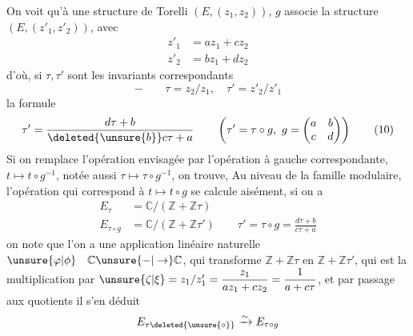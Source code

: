 On voit qu'à une structure de Torelli $(E,(z_1,z_2))$, $g$ associe la structure $(E,(z'_1,z'_2))$, avec
\[
\begin{aligned}
z'_1&=az_1+cz_2\\
z'_2&=bz_1+dz_2
\end{aligned}
\]
d'où, si $\tau,\tau'$ sont les invariants correspondants
\[
-\qquad \tau=z_2/z_1,\quad\tau'=z'_2/z'_1
\]
la formule
\[
\tau'=\frac{d\tau+b}{\deleted{\unsure{b}}c\tau+a}\qquad
\left(\tau'=\tau\circ g,\ g=\begin{pmatrix}a&b\\c&d\end{pmatrix}\right) \tag*{(10)}
\]
Si on remplace l'opération envisagée par l'opération à gauche correspondante,  $t\longmapsto t\circ g^{-1}$, notée aussi $\tau\longmapsto\tau\circ g^{-1}$, on trouve,
Au niveau de la famille modulaire, l'opération qui correspond à $t\longmapsto t\circ g$ se calcule aisément, si on a
\[
\begin{aligned}
E_\tau &=\mathbb C/(\mathbb Z+\mathbb Z\tau)\\
E_{\tau\circ g}&=\mathbb C/(\mathbb Z+\mathbb Z\tau')\qquad \tau'=\tau\circ g=\frac{d\tau+b}{c\tau+a}
\end{aligned}
\]
on note que l'on a une application  linéaire naturelle $\unsure{\varphi|\phi}\quad\mathbb C\unsure{-|\to}\mathbb C$, qui transforme $\mathbb Z+\mathbb Z\tau$ en $\mathbb Z+\mathbb Z\tau'$, qui est la multiplication par $\unsure{\zeta|\xi}=z_1/z'_1=\dfrac{z_1}{az_1+cz_2}=\dfrac{1}{a+c\tau}$,
et par passage aux quotients il s'en déduit
\[
E_{\tau\deleted{\unsure{\circ}}}\xrightarrow{\sim}E_{\tau\circ g}
\]
